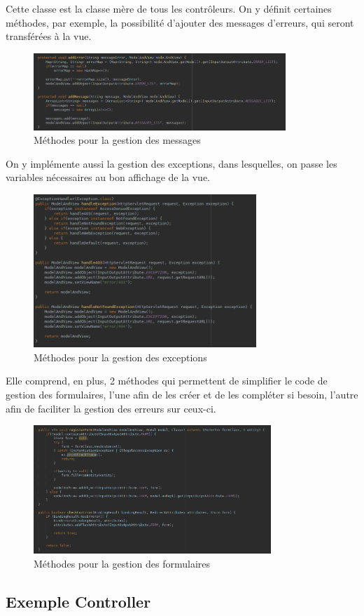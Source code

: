 			Cette classe est la classe mère de tous les contrôleurs. On y définit certaines méthodes, par exemple, la possibilité d'ajouter des messages d'erreurs, qui seront transférées à la vue.

			\begin{figure}[H]
				\centering\includegraphics[width=0.85\textwidth, keepaspectratio]{res/AbstractWebController-messages.png}
				\caption{Méthodes pour la gestion des messages}
			\end{figure}

			On y implémente aussi la gestion des exceptions, dans lesquelles, on passe les variables nécessaires au bon affichage de la vue.

			\begin{figure}[H]
				\centering\includegraphics[width=0.75\textwidth, keepaspectratio]{res/AbstractWebController-exception.png}
				\caption{Méthodes pour la gestion des exceptions}
			\end{figure}

			Elle comprend, en plus, 2 méthodes qui permettent de simplifier le code de gestion des formulaires, l'une afin de les créer et de les compléter si besoin, l'autre afin de faciliter la gestion des erreurs sur ceux-ci.

			\begin{figure}[H]
				\centering\includegraphics[width=0.80\textwidth, keepaspectratio]{res/AbstractWebController-form.png}
				\caption{Méthodes pour la gestion des formulaires}
			\end{figure}

		\subsection{Exemple Controller}

